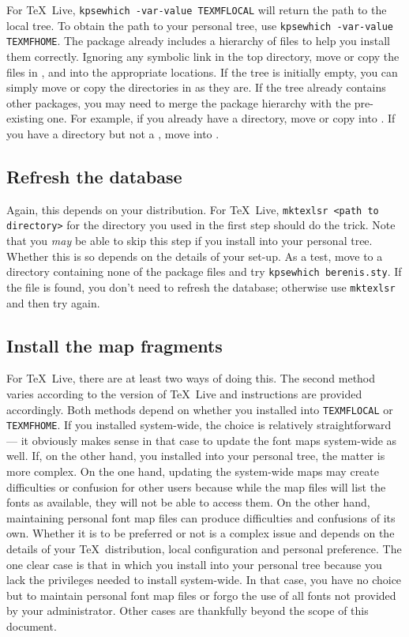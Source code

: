 \documentclass[11pt,british]{article}
\begin{document}
For \TeX~Live, \verb|kpsewhich -var-value TEXMFLOCAL| will return the path to the local tree. To obtain the path to your personal tree, use \verb|kpsewhich -var-value TEXMFHOME|. The package already includes a hierarchy of files to help you install them correctly. Ignoring any symbolic link in the top directory, move or copy the files in ,  and  into the appropriate locations. If the tree is initially empty, you can simply move or copy the directories in as they are. If the tree already contains other packages, you may need to merge the package hierarchy with the pre-existing one. For example, if you already have a  directory, move or copy  into . If you have a  directory but not a , move  into .

\subsection{Refresh the database}

Again, this depends on your distribution. For \TeX~Live, \verb|mktexlsr <path to directory>| for the directory you used in the first step should do the trick. Note that you \emph{may} be able to skip this step if you install into your personal tree. Whether this is so depends on the details of your set-up. As a test, move to a directory containing none of the package files and try \verb|kpsewhich berenis.sty|. If the file is found, you don't need to refresh the database; otherwise use \verb|mktexlsr| and then try again.

\subsection{Install the map fragments}

For \TeX~Live, there are at least two ways of doing this. The second method varies according to the version of \TeX~Live and instructions are provided accordingly. Both methods depend on whether you installed into \verb|TEXMFLOCAL| or \verb|TEXMFHOME|. If you installed system-wide, the choice is relatively straightforward --- it obviously makes sense in that case to update the font maps system-wide as well. If, on the other hand, you installed into your personal tree, the matter is more complex. On the one hand, updating the system-wide maps may create difficulties or confusion for other users because while the map files will list the fonts as available, they will not be able to access them. On the other hand, maintaining personal font map files can produce difficulties and confusions of its own. Whether it is to be preferred or not is a complex issue and depends on the details of your \TeX\ distribution, local configuration and personal preference. The one clear case is that in which you install into your personal tree because you lack the privileges needed to install system-wide. In that case, you have no choice but to maintain personal font map files or forgo the use of all fonts not provided by your administrator. Other cases are thankfully beyond the scope of this document.
\end{document}
